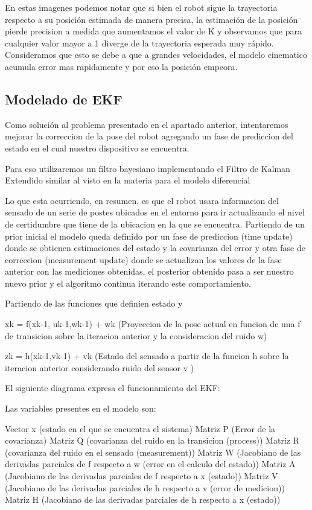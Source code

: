 

En estas imagenes podemos notar que si bien el robot sigue la trayectoria respecto a su posición estimada de manera precisa, la estimación de la posición pierde precision a medida que aumentamos el valor de K y observamos que para cualquier valor mayor a 1 diverge de la trayectoria esperada muy rápido. Consideramos que esto se debe a que a grandes velocidades, el modelo cinematico acumula error mas rapidamente y por eso la posición empeora.

\subsection{Modelado de EKF}

Como solución al problema presentado en el apartado anterior, intentaremos mejorar la correccion de la pose del robot agregando un fase de prediccion del estado en el cual nuestro dispositivo se encuentra.


Para eso utilizaremos un filtro bayesiano implementando el Filtro de Kalman Extendido similar al visto en la materia para el modelo diferencial

Lo que esta ocurriendo, en resumen, es que el robot usara informacion del sensado de un serie de postes ubicados en el entorno para ir actualizando el nivel de certidumbre que tiene de la ubicacion en la que se encuentra. Partiendo de un prior inicial el modelo queda definido por un fase de prediccion (time update) donde se obtienen estimaciones del estado y la covarianza del error y otra fase de correccion (measurement update) donde se actualizan los valores de la fase anterior con las mediciones obtenidas, el posterior obtenido pasa a ser nuestro nuevo prior y el algoritmo continua iterando este comportamiento.


Partiendo de las funciones que definien estado y 

xk = f(xk-1, uk-1,wk-1) + wk  (Proyeccion de la pose actual en funcion de una f de transicion sobre la iteracion anterior y la consideracion del ruido w)

zk = h(xk-1,vk-1) + vk   (Estado del sensado a partir de la funcion h sobre la iteracion anterior considerando ruido del sensor v )

El siguiente diagrama expresa el funcionamiento del EKF:


Las variables presentes en el modelo son: 

Vector x (estado en el que se encuentra el sistema)
Matriz P (Error de la covarianza)
Matriz Q (covarianza del ruido en la transicion (process))
Matriz R (covarianza del ruido en el sensado (measurement))
Matriz W (Jacobiano de las derivadas parciales de f respecto a w (error en el calculo del estado))
Matriz A (Jacobiano de las derivadas parciales de f respecto a x (estado))
Matriz V (Jacobiano de las derivadas parciales de h respecto a v (error de medicion))
Matriz H (Jacobiano de las derivadas parciales de h respecto a x (estado))
 
